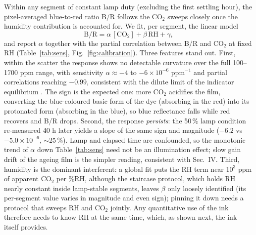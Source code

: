 \documentclass[twocolumn]{revtex4}
\begin{document}
Within any segment of constant lamp duty (excluding the first settling hour),
the pixel-averaged blue-to-red ratio B/R follows the CO$_2$ sweeps closely
once the humidity contribution is accounted for. We fit, per segment, the
linear model
\begin{equation}
\mathrm{B/R} = \alpha\,[\mathrm{CO_2}] + \beta\,\mathrm{RH} + \gamma,
\label{eq:linmodel}
\end{equation}
and report $\alpha$ together with the partial correlation between B/R and
CO$_2$ at fixed RH (Table~\ref{tab:sens}, Fig.~\ref{fig:calibration}). Three
features stand out. First, within the scatter the response shows no
detectable curvature over the full 100--1700 ppm range, with sensitivity
$\alpha \approx -4$ to $-6 \times 10^{-6}$ ppm$^{-1}$ and partial
correlations reaching $-0.99$, consistent with the dilute limit of the
indicator equilibrium \cite{mills92}. The sign is the expected one:
more CO$_2$ acidifies the film, converting the blue-coloured basic form of
the dye (absorbing in the red) into its protonated form (absorbing in the
blue), so blue reflectance falls while red recovers and B/R drops. Second, the response \emph{persists}: the 50\,\% lamp condition
re-measured 40 h later yields a slope of the same sign and magnitude
($-6.2$ vs $-5.0\times10^{-6}$, $\sim$25\,\%). Lamp and elapsed time are
confounded, so the monotonic trend of $\alpha$ down Table~\ref{tab:sens}
need not be an illumination effect; slow gain drift of the ageing film is
the simpler reading, consistent with Sec.~IV. Third,
humidity is the dominant interferent: a global fit puts the RH term near
$10^3$ ppm of apparent CO$_2$ per \%RH, although the staircase protocol,
which holds RH nearly constant inside lamp-stable segments, leaves $\beta$
only loosely identified (its per-segment value varies in magnitude and even
sign); pinning it down needs a protocol that sweeps RH and CO$_2$ jointly.
Any quantitative use of the ink therefore needs to know RH at the same time,
which, as shown next, the ink itself provides.
\end{document}
